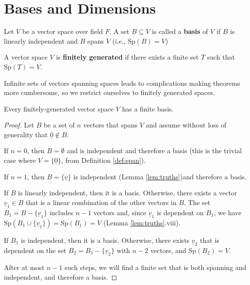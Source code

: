 
\section{Bases and Dimensions}

\begin{definition}[Basis]\label{def:basis}
    Let $V$ be a vector space over field $F$. A set $B \subseteq V$ is called a \textbf{basis} of $V$ if $B$ is linearly independent and $B$ spans $V$ (i.e., $\mathrm{Sp}(B) = V$)
\end{definition}

\begin{definition}\label{def:finitely-generated}
    A vector space $V$ is \textbf{finitely generated} if there exists a finite set $T$ such that $\mathrm{Sp}(T) = V$.
\end{definition}

\begin{note}
    Infinite sets of vectors spanning spaces leads to complications making theorems more cumbersome, so we restrict ourselves to finitely generated spaces.
\end{note}

\begin{theorem}\label{thm:finite-basis-exists}
    Every finitely-generated vector space $V$ has a finite basis.
\end{theorem}

\begin{proof}
    Let $B$ be a set of $n$ vectors that spans $V$ and assume without loss of generality that $\underline{0} \notin B$.
    
    If $n = 0$, then $B = \emptyset$ and is independent and therefore a basis (this is the trivial case where $V = \{\underline{0}\}$, from Definition \ref{def:span}).
    
    If $n = 1$, then $B = \{\underline{v}\}$ is independent (Lemma \ref{lem:truths})and therefore a basis.
    
    If $B$ is linearly independent, then it is a basis. Otherwise, there exists a vector $\underline{v}_1 \in B$ that is a linear combination of the other vectors in $B$. The set $B_1 = B - \{\underline{v}_1\}$ includes $n-1$ vectors and, since $\underline{v}_1$ is dependent on $B_1$, we have $\mathrm{Sp}(B_1 \cup \{\underline{v}_1\}) = \mathrm{Sp}(B_1) = V$ (Lemma \ref{lem:truths}.viii).
    
    If $B_1$ is independent, then it is a basis. Otherwise, there exists $\underline{v}_2$ that is dependent on the set $B_2 = B_1 - \{\underline{v}_2\}$ with $n-2$ vectors, and $\mathrm{Sp}(B_2) = V$.
    
    After at most $n-1$ such steps, we will find a finite set that is both spanning and independent, and therefore a basis.
\end{proof}

